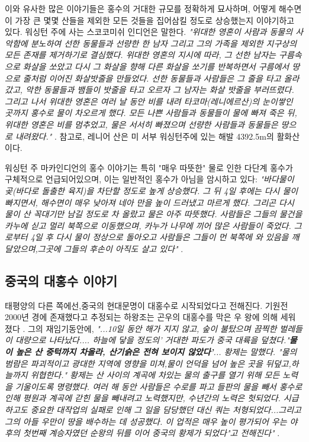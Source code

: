 \documentclass[10pt,twocolumn,letterpaper]{article}
\begin{document}
이와 유사한 많은 이야기들은 홍수의 거대한 규모를 정확하게 묘사하며, 어떻게 해수면이  가장 큰 몇몇 산들을 제외한 모든 것들을 집어삼킬 정도로  상승했는지  이야기하고 있다. 워싱턴 주에 사는 스코코미쉬 인디언은 말한다. \textit{"위대한 영혼이 사람과 동물의 사악함에 분노하여 선한 동물들과 선량한 한 남자 그리고 그의 가족을 제외한 지구상의 모든 존재를 제거하기로 결심했다. 위대한 영혼의 지시에 따라, 그 선한 남자는 구름속으로 화살을 쏘았고 다시 그 화살을 향해 다른 화살을 쏘기를 반복하면서 구름에서 땅으로 줄처럼 이어진 화살밧줄을 만들었다. 선한 동물들과 사람들은 그 줄을 타고 올라갔고, 악한 동물들과 뱀들이 밧줄을 타고 오르자 그 남자는 화살 밧줄을 부러뜨렸다. 그리고 나서 위대한 영혼은 여러 날 동안 비를 내려 타코마(레니에르산)의 눈이쌓인 곳까지 홍수로 물이 차오르게 했다. 모든 나쁜 사람들과 동물들이 물에 빠져 죽은 뒤, 위대한 영혼은 비를 멈추었고, 물은 서서히 빠졌으며 선량한 사람들과 동물들은 땅으로 내려왔다."} \cite{3}. 참고로, 레니어 산은 미 서부 워싱턴주에 있는 해발 4392.5m의 활화산이다. 

워싱턴 주 마카인디언의 홍수 이야기는 특히 "매우 따뜻한" 물로 인한 다단계 홍수가 구체적으로 언급되어있으며, 이는 일반적인 홍수가 아님을 암시하고 있다: \textit{"바다물이 곶(바다로 돌출한 육지)을 차단할 정도로 높게 상승했다. 그 뒤 4일 후에는 다시 물이 빠지면서, 해수면이 매우 낮아져 네아 만을 높이 드러냈고 마르게 했다. 그리곤 다시  물이 산 꼭대기만 남길 정도로 차 올랐고 물은 아주 따뜻했다. 사람들은 그들의 물건을 카누에 싣고 멀리 북쪽으로 이동했으며,  카누가 나무에 끼어 많은 사람들이 죽었다. 그로부터 4일 후 다시 물이 정상으로 돌아오고 사람들은 그들이 먼 북쪽에 와 있음을 깨달았으며,그곳에 그들의 후손이 아직도 살고 있다"} \cite{3}.

\subsection{중국의 대홍수 이야기}

태평양의 다른 쪽에선,중국의 현대문명이 대홍수로 시작되었다고 전해진다. 기원전 2000년 경에 존재했다고 추정되는 하왕조는 곤우의 대홍수를 막은 우 왕에 의해 세워졌다 \cite{6}. 그의 재임기동안에, \textit{"...10일 동안 해가 지지 않고, 숲이 불탔으며 끔찍한 벌레들이 대량으로 나타났다.... 하늘에 닿을 정도의’ 거대한 파도가 중국 대륙을 덮쳤다."\textbf{물이 높은 산 중턱까지 차올라, 산기슭은 전혀 보이지 않았다'}... 황제는 말했다. "물의 범람은 파괴적이고 광대한 지역에 영향을 미쳐,물이 언덕을 넘어 높은 곳을 뒤덮고,하늘까지 위협한다." 황제는 산 사이의 계곡에 차있는 물의 출구를 열기 위해 모든 노력을 기울이도록 명령했다. 여러 해 동안 사람들은 수로를 파고 들판의 물을 빼서 홍수로 인해 평원과 계곡에 갇힌 물을 빼내려고 노력했지만, 수년간의 노력은 헛되었다. 시급하고도 중요한 대작업의 실패로 인해 그 일을 담당했던 대신 쿼는 처형되었다...그리고 그의 아들 우만이 땅을 배수하는 데 성공했다. 이 업적은 매우 높이 평가되어 우는 야후의 첫번째 계승자였던 순왕의 뒤를 이어 중국의 황제가 되었다"고 전해진다"} \cite{5}.
\end{document}
